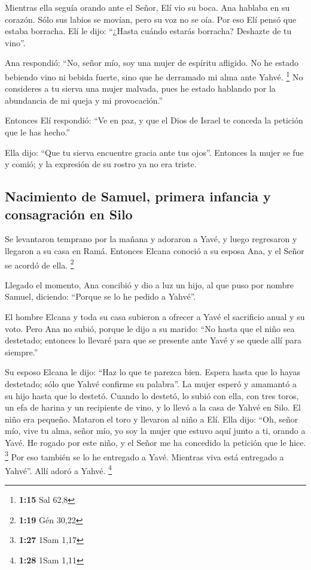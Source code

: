  Mientras ella seguía orando ante el Señor, Elí vio su
boca.  Ana hablaba en su corazón. Sólo sus labios se
movían, pero su voz no se oía. Por eso Elí pensó que estaba borracha.
 Elí le dijo: ``¿Hasta cuándo estarás borracha? Deshazte
de tu vino''.

 Ana respondió: ``No, señor mío, soy una mujer de
espíritu afligido. No he estado bebiendo vino ni bebida fuerte, sino que
he derramado mi alma ante Yahvé. \footnote{\textbf{1:15} Sal 62,8}
 No consideres a tu sierva una mujer malvada, pues he
estado hablando por la abundancia de mi queja y mi provocación.''

 Entonces Elí respondió: ``Ve en paz, y que el Dios de
Israel te conceda la petición que le has hecho.''

 Ella dijo: ``Que tu sierva encuentre gracia ante tus
ojos''. Entonces la mujer se fue y comió; y la expresión de su rostro ya
no era triste.

\hypertarget{nacimiento-de-samuel-primera-infancia-y-consagraciuxf3n-en-silo}{%
\subsection{Nacimiento de Samuel, primera infancia y consagración en
Silo}\label{nacimiento-de-samuel-primera-infancia-y-consagraciuxf3n-en-silo}}

 Se levantaron temprano por la mañana y adoraron a Yavé,
y luego regresaron y llegaron a su casa en Ramá. Entonces Elcana conoció
a su esposa Ana, y el Señor se acordó de ella. \footnote{\textbf{1:19}
  Gén 30,22}

 Llegado el momento, Ana concibió y dio a luz un hijo, al
que puso por nombre Samuel, diciendo: ``Porque se lo he pedido a
Yahvé''.

 El hombre Elcana y toda su casa subieron a ofrecer a
Yavé el sacrificio anual y su voto.  Pero Ana no subió,
porque le dijo a su marido: ``No hasta que el niño sea destetado;
entonces lo llevaré para que se presente ante Yavé y se quede allí para
siempre.''

 Su esposo Elcana le dijo: ``Haz lo que te parezca bien.
Espera hasta que lo hayas destetado; sólo que Yahvé confirme su
palabra''. La mujer esperó y amamantó a su hijo hasta que lo destetó.
 Cuando lo destetó, lo subió con ella, con tres toros, un
efa de harina y un recipiente de vino, y lo llevó a la casa de Yahvé en
Silo. El niño era pequeño.  Mataron el toro y llevaron al
niño a Elí.  Ella dijo: ``Oh, señor mío, vive tu alma,
señor mío, yo soy la mujer que estuvo aquí junto a ti, orando a Yavé.
 He rogado por este niño, y el Señor me ha concedido la
petición que le hice. \footnote{\textbf{1:27} 1Sam 1,17} 
Por eso también se lo he entregado a Yavé. Mientras viva está entregado
a Yahvé''. Allí adoró a Yahvé. \footnote{\textbf{1:28} 1Sam 1,11}

